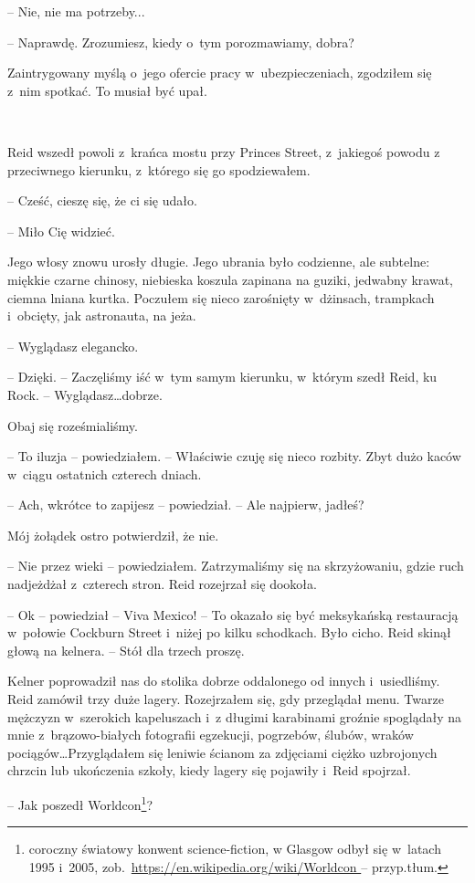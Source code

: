 \documentclass[oneside,polish,11pt,sfheadings]{mwbk}
\begin{document}
-- Nie, nie ma potrzeby...

-- Naprawdę. Zrozumiesz, kiedy o~tym porozmawiamy, dobra?

Zaintrygowany myślą o~jego ofercie pracy w~ubezpieczeniach, zgodziłem
się z~nim spotkać. To musiał być upał.

~

Reid wszedł powoli z~krańca mostu przy Princes Street, z~jakiegoś powodu
z przeciwnego kierunku, z~którego się go spodziewałem.

-- Cześć, cieszę się, że ci się udało.

-- Miło Cię widzieć.

Jego włosy znowu urosły długie. Jego ubrania było codzienne, ale
subtelne: miękkie czarne chinosy, niebieska koszula zapinana na guziki,
jedwabny krawat, ciemna lniana kurtka. Poczułem się nieco zarośnięty w~dżinsach, trampkach i~obcięty, jak astronauta, na jeża.

-- Wyglądasz elegancko.

-- Dzięki. -- Zaczęliśmy iść w~tym samym kierunku, w~którym szedł Reid, ku
Rock. -- Wyglądasz\ldots dobrze.

Obaj się roześmialiśmy.

-- To iluzja -- powiedziałem. -- Właściwie czuję się nieco rozbity. Zbyt
dużo kaców w~ciągu ostatnich czterech dniach.

-- Ach, wkrótce to zapijesz -- powiedział. -- Ale najpierw, jadłeś?

Mój żołądek ostro potwierdził, że nie. 

-- Nie przez wieki -- powiedziałem.
Zatrzymaliśmy się na skrzyżowaniu, gdzie ruch nadjeżdżał z~czterech
stron. Reid rozejrzał się dookoła.

-- Ok -- powiedział -- Viva Mexico! -- To okazało się być meksykańską
restauracją w~połowie Cockburn Street i~niżej po kilku schodkach. Było
cicho. Reid skinął głową na kelnera. -- Stół dla trzech proszę.

Kelner poprowadził nas do stolika dobrze oddalonego od innych i~usiedliśmy. Reid zamówił trzy duże lagery. Rozejrzałem się, gdy
przeglądał menu. Twarze mężczyzn w~szerokich kapeluszach i~z długimi
karabinami groźnie spoglądały na mnie z~brązowo-białych fotografii
egzekucji, pogrzebów, ślubów, wraków pociągów\ldots Przyglądałem się
leniwie ścianom za zdjęciami ciężko uzbrojonych chrzcin lub ukończenia
szkoły, kiedy lagery się pojawiły i~Reid spojrzał.

-- Jak poszedł Worldcon\footnote{coroczny światowy konwent science-fiction,
w Glasgow odbył się w~latach 1995 i~2005,
zob.~\url{https://en.wikipedia.org/wiki/Worldcon } -- przyp.tłum.}? 
\end{document}
